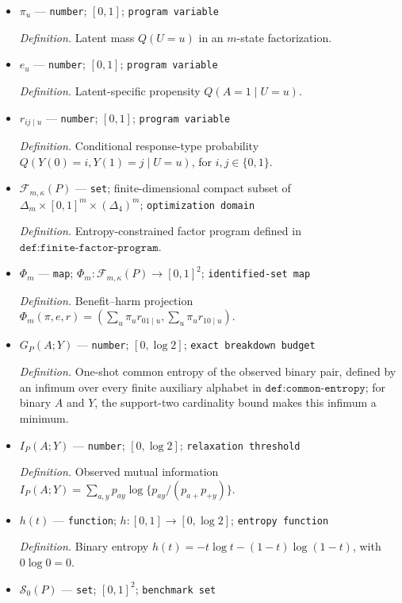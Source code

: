 \documentclass{article}
\begin{document}
\begin{itemize}
  \item \(\pi_u\) --- \texttt{number}; \([0,1]\); \texttt{program variable}
  \par\smallskip\noindent\emph{Definition.} Latent mass \(Q(U=u)\) in an \(m\)-state factorization.
  \item \(e_u\) --- \texttt{number}; \([0,1]\); \texttt{program variable}
  \par\smallskip\noindent\emph{Definition.} Latent-specific propensity \(Q(A=1\mid U=u)\).
  \item \(r_{ij\mid u}\) --- \texttt{number}; \([0,1]\); \texttt{program variable}
  \par\smallskip\noindent\emph{Definition.} Conditional response-type probability \(Q(Y(0)=i,Y(1)=j\mid U=u)\), for \(i,j\in\{0,1\}\).
  \item \(\mathcal F_{m,\kappa}(P)\) --- \texttt{set}; finite-dimensional compact subset of \(\Delta_m\times[0,1]^m\times(\Delta_4)^m\); \texttt{optimization domain}
  \par\smallskip\noindent\emph{Definition.} Entropy-constrained factor program defined in \(\texttt{def:finite-factor-program}\).
  \item \(\Phi_m\) --- \texttt{map}; \(\Phi_m:\mathcal F_{m,\kappa}(P)\to[0,1]^2\); \texttt{identified-\allowbreak{}set map}
  \par\smallskip\noindent\emph{Definition.} Benefit--harm projection \(\Phi_m(\pi,e,r)=(\sum_u\pi_u r_{01\mid u},\sum_u\pi_u r_{10\mid u})\).
  \item \(G_P(A;Y)\) --- \texttt{number}; \([0,\log 2]\); \texttt{exact breakdown budget}
  \par\smallskip\noindent\emph{Definition.} One-shot common entropy of the observed binary pair, defined by an infimum over every finite auxiliary alphabet in \(\texttt{def:common-entropy}\); for binary \(A\) and \(Y\), the support-two cardinality bound makes this infimum a minimum.
  \item \(I_P(A;Y)\) --- \texttt{number}; \([0,\log 2]\); \texttt{relaxation threshold}
  \par\smallskip\noindent\emph{Definition.} Observed mutual information \(I_P(A;Y)=\sum_{a,y}p_{ay}\log\{p_{ay}/(p_{a+}p_{+y})\}\).
  \item \(h(t)\) --- \texttt{function}; \(h:[0,1]\to[0,\log 2]\); \texttt{entropy function}
  \par\smallskip\noindent\emph{Definition.} Binary entropy \(h(t)=-t\log t-(1-t)\log(1-t)\), with \(0\log0=0\).
  \item \(\mathcal S_0(P)\) --- \texttt{set}; \([0,1]^2\); \texttt{benchmark set}

\end{itemize}
\end{document}

